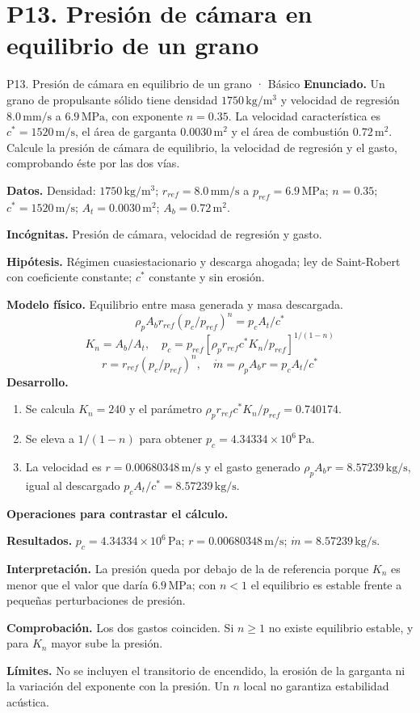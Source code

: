 \section{P13. Presión de cámara en equilibrio de un grano}
\begin{studiumworked}{P13. Presión de cámara en equilibrio de un grano · Básico}
\textbf{Enunciado.} Un grano de propulsante sólido tiene densidad $1750\,\mathrm{kg/m^3}$ y velocidad de regresión $8.0\,\mathrm{mm/s}$ a $6.9\,\mathrm{MPa}$, con exponente $n=0.35$. La velocidad característica es $c^*=1520\,\mathrm{m/s}$, el área de garganta $0.0030\,\mathrm{m^2}$ y el área de combustión $0.72\,\mathrm{m^2}$. Calcule la presión de cámara de equilibrio, la velocidad de regresión y el gasto, comprobando éste por las dos vías.

\textbf{Datos.} Densidad: $1750\,\mathrm{kg/m^3}$; $r_{ref}=8.0\,\mathrm{mm/s}$ a $p_{ref}=6.9\,\mathrm{MPa}$; $n=0.35$; $c^*=1520\,\mathrm{m/s}$; $A_t=0.0030\,\mathrm{m^2}$; $A_b=0.72\,\mathrm{m^2}$.

\textbf{Incógnitas.} Presión de cámara, velocidad de regresión y gasto.

\textbf{Hipótesis.} Régimen cuasiestacionario y descarga ahogada; ley de Saint-Robert con coeficiente constante; $c^*$ constante y sin erosión.

\textbf{Modelo físico.} Equilibrio entre masa generada y masa descargada.
\[\rho_pA_br_{ref}(p_c/p_{ref})^n=p_cA_t/c^*\]
\[K_n=A_b/A_t,\quad p_c=p_{ref}\left[\rho_pr_{ref}c^*K_n/p_{ref}\right]^{1/(1-n)}\]
\[r=r_{ref}(p_c/p_{ref})^n,\quad \dot m=\rho_pA_br=p_cA_t/c^*\]
\textbf{Desarrollo.}
\begin{enumerate}
\item Se calcula $K_n=240$ y el parámetro $\rho_pr_{ref}c^*K_n/p_{ref}=0.740174$.
\item Se eleva a $1/(1-n)$ para obtener $p_c=4.34334\times10^{6}\,\mathrm{Pa}$.
\item La velocidad es $r=0.00680348\,\mathrm{m/s}$ y el gasto generado $\rho_pA_br=8.57239\,\mathrm{kg/s}$, igual al descargado $p_cA_t/c^*=8.57239\,\mathrm{kg/s}$.
\end{enumerate}
\textbf{Operaciones para contrastar el cálculo.}

\textbf{Resultados.} $p_c=4.34334\times10^{6}\,\mathrm{Pa}$; $r=0.00680348\,\mathrm{m/s}$; $\dot m=8.57239\,\mathrm{kg/s}$.

\textbf{Interpretación.} La presión queda por debajo de la de referencia porque $K_n$ es menor que el valor que daría $6.9\,\mathrm{MPa}$; con $n<1$ el equilibrio es estable frente a pequeñas perturbaciones de presión.

\textbf{Comprobación.} Los dos gastos coinciden. Si $n\geq1$ no existe equilibrio estable, y para $K_n$ mayor sube la presión.

\textbf{Límites.} No se incluyen el transitorio de encendido, la erosión de la garganta ni la variación del exponente con la presión. Un $n$ local no garantiza estabilidad acústica.
\end{studiumworked}
